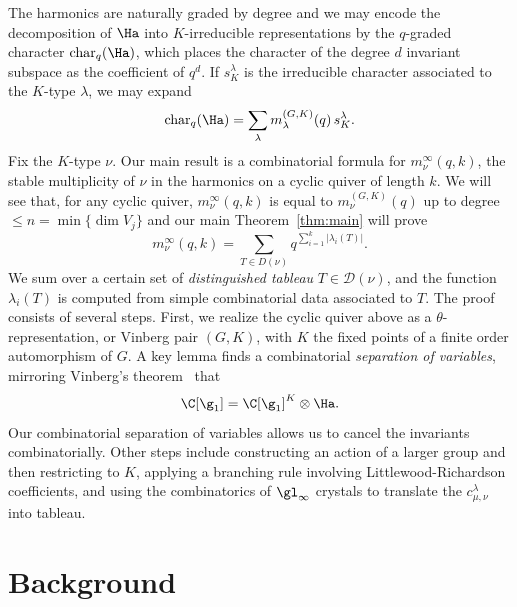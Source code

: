 The harmonics are naturally graded by degree and we may encode the decomposition of $\Ha$ into $K$-irreducible representations by the $q$-graded character $\text{char}_q(\Ha)$, which places the character of the degree $d$ invariant subspace as the coefficient of $q^d$. If $s_K^\lambda$ is the irreducible character associated to the $K$-type $\lambda$, we may expand
\begin{equation*}
    \text{char}_q(\Ha) = \sum_\lambda m_\lambda^{(G,K)}(q) \, s_K^\lambda.
\end{equation*}
Fix the $K$-type $\nu$. Our main result is a combinatorial formula for $m_\nu^\infty(q,k)$, the stable multiplicity of $\nu$ in the harmonics on a cyclic quiver of length $k$. We will see that, for any cyclic quiver, $m_\nu^\infty(q,k)$ is equal to $m_\nu^{(G,K)}(q)$ up to degree $\leq n = \min \{ \dim V_j \}$ and our main Theorem~\ref{thm:main} will prove
$$m_\nu^\infty(q,k) = \sum_{T \in D(\nu)} q^{\sum_{i=1}^k |\lambda_i(T)|}.$$
We sum over a certain set of \textit{distinguished tableau} $T \in \mathcal{D}(\nu)$, and the function $\lambda_i(T)$ is computed from simple combinatorial data associated to $T$. The proof consists of several steps. First, we realize the cyclic quiver above as a $\theta$-representation, or Vinberg pair $(G,K)$, with $K$ the fixed points of a finite order automorphism of $G$. A key lemma finds a combinatorial \textit{separation of variables}, mirroring Vinberg's theorem~\cite{Vinberg1976} that
\begin{equation*}
    \C[\g_1] = \C[\g_1]^K \otimes \Ha.
\end{equation*}
Our combinatorial separation of variables allows us to cancel the invariants combinatorially. Other steps include constructing an action of a larger group and then restricting to $K$, applying a branching rule involving Littlewood-Richardson coefficients, and using the combinatorics of $\gl_\infty$ crystals to translate the $c^\lambda_{\mu,\nu}$ into tableau.

\section{Background}

